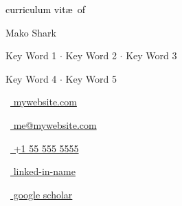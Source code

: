 \begin{scriptsize}
	 \textcolor{black}{curriculum vit\ae~of}
\end{scriptsize}

\vspace*{-0.10em}
\begin{Large} 
	Mako Shark
\end{Large}

\vspace*{0.25em}
\begin{scshape}
	\begin{footnotesize}
		  \textcolor{highlight2}{Key Word 1 $\cdot$ Key Word 2 $\cdot$ Key Word 3}
		  
		  \vspace*{-1ex}
		  \textcolor{highlight2}{Key Word 4 $\cdot$ Key Word 5}
	\end{footnotesize}
\end{scshape}
\vspace*{0.4cm}

\begin{footnotesize}
	\begin{tiny}\faHome\end{tiny}~\href{https://google.com}{
		mywebsite.com
	}
	\quad \begin{tiny}\faEnvelope[regular]\end{tiny}~\href{mailto:me@mywebsite.com}{%
		me@mywebsite.com
	} 
	
	\begin{tiny}\faMobile*\end{tiny}~\href{tel:001555555555}{
		+1 55 555 5555
	} 
	\quad 
	\begin{tiny}\faLinkedinIn\end{tiny}~\href{https://www.linkedin.com/in/MYLINK/}{
		linked-in-name
	}
	\quad 
	\begin{tiny}\faGraduationCap\end{tiny}~\href{https://scholar.google.com/citations?user=USERID&hl=en}{
		 google scholar
		}

\end{footnotesize}
